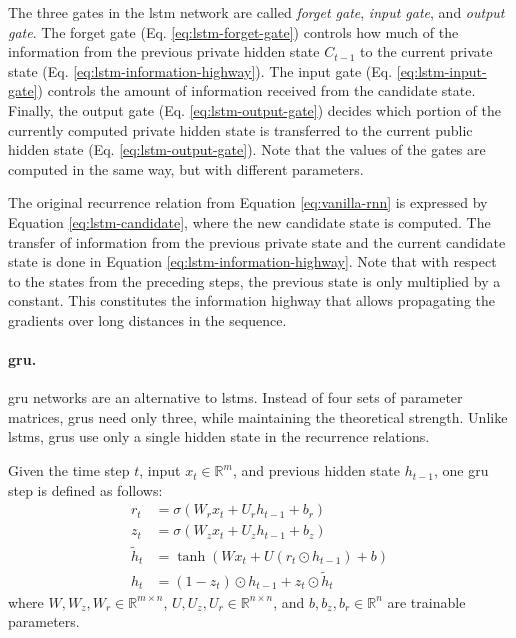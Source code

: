 The three gates in the \gls{lstm} network are called \emph{forget gate},
\emph{input gate}, and \emph{output gate}. The forget gate (Eq.
\ref{eq:lstm-forget-gate}) controls how much of the information from the
previous private hidden state $C_{t-1}$ to the current private state (Eq.
\ref{eq:lstm-information-highway}). The input gate (Eq.
\ref{eq:lstm-input-gate}) controls the amount of information received from the
candidate state. Finally, the output gate (Eq. \ref{eq:lstm-output-gate})
decides which portion of the currently computed private hidden state is
transferred to the current public hidden state
(Eq. \ref{eq:lstm-output-gate}). Note that the values of the gates are computed
in the same way, but with different parameters.

The original recurrence relation from Equation \ref{eq:vanilla-rnn} is expressed
by Equation \ref{eq:lstm-candidate}, where the new candidate state is
computed. The transfer of information from the previous private state and the
current candidate state is done in Equation
\ref{eq:lstm-information-highway}. Note that with respect to the states from the
preceding steps, the previous state is only multiplied by a constant. This
constitutes the information highway that allows propagating the gradients over
long distances in the sequence.

\paragraph{\acrshort{gru}.} \acrlong{gru} networks \citep{cho2014gru} are an
alternative to \glspl{lstm}. Instead of four sets of parameter matrices,
\glspl{gru} need only three, while maintaining the theoretical strength. Unlike
\glspl{lstm}, \glspl{gru} use only a single hidden state in the recurrence
relations.

Given the time step $t$, input $x_t \in \mathbb{R}^m$, and previous hidden state
$h_{t-1}$, one \gls{gru} step is defined as follows:
%
\begin{align}
  r_t &= \sigma\left(W_r x_t + U_r h_{t-1} + b_r\right) \label{eq:gru-reset-gate} \\
  z_t &= \sigma\left(W_z x_t + U_z h_{t-1} + b_z\right) \label{eq:gru-update-gate} \\
  \tilde{h}_t &= \tanh \left(W x_t + U \left( r_t \odot h_{t-1} \right) + b \right) \label{eq:gru-candidate} \\
  h_t &= (1 - z_t) \odot h_{t-1} + z_t \odot \tilde{h}_t \label{eq:gru-hidden-state}
\end{align}
%
where $W, W_z, W_r \in \mathbb{R}^{m\times n}$,
$U, U_z, U_r \in \mathbb{R}^{n \times n}$, and $b, b_z, b_r \in \mathbb{R}^n$
are trainable parameters.

